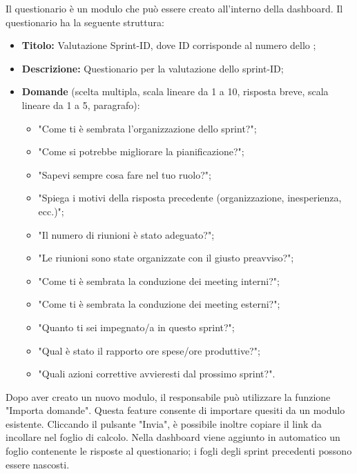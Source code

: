 \par Il questionario è un modulo  che può essere creato all'interno della dashboard. Il questionario ha la seguente struttura:
\begin{itemize}
  \item \textbf{Titolo:} Valutazione Sprint-ID, dove ID corrisponde al numero dello ;
  \item \textbf{Descrizione:} Questionario per la valutazione dello sprint-ID;
  \item \textbf{Domande} (scelta multipla, scala lineare da 1 a 10, risposta breve, scala lineare da 1 a 5, paragrafo):
  \begin{itemize}
    \item "Come ti è sembrata l'organizzazione dello sprint?";
    \item "Come si potrebbe migliorare la pianificazione?";
    \item "Sapevi sempre cosa fare nel tuo ruolo?";
    \item "Spiega i motivi della risposta precedente (organizzazione, inesperienza, ecc.)";
    \item "Il numero di riunioni è stato adeguato?";
    \item "Le riunioni sono state organizzate con il giusto preavviso?";
    \item "Come ti è sembrata la conduzione dei meeting interni?";
    \item "Come ti è sembrata la conduzione dei meeting esterni?";
    \item "Quanto ti sei impegnato/a in questo sprint?";
    \item "Qual è stato il rapporto ore spese/ore produttive?";
    \item "Quali azioni correttive avvieresti dal prossimo sprint?".
  \end{itemize}
\end{itemize}
\par Dopo aver creato un nuovo modulo, il responsabile può utilizzare la funzione "Importa domande". Questa feature consente di importare quesiti da un modulo esistente. Cliccando il pulsante "Invia", è possibile inoltre copiare il link da incollare nel foglio di calcolo. Nella dashboard  viene aggiunto in automatico un foglio contenente le risposte al questionario; i fogli degli sprint precedenti possono essere nascosti.

